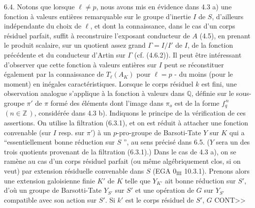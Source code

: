 6.4. Notons que lorsque $\ell \neq p$, nous avons mis en évidence dans 4.3 a) une fonction à valeurs entières remarquable sur le groupe d'inertie $I$ de $S$, d'ailleurs indépendante du choix de $\ell$, et dont la connaissance, dans le cas d'un corps résiduel parfait, suffit à reconstruire l'exposant conducteur de $A$ (4.5), en prenant le produit scalaire, sur un quotient assez grand $\Gamma = I/I'$ de $I$, de la fonction précédente et du conducteur d'Artin sur $\Gamma$ (cf. (4.6.2)). Il peut être intéressant d'observer que cette fonction à valeurs entières sur $I$ peut se réconstituer également par la connaissance de $T_\ell(A_K)$ pour $\ell = p$ - du moins (pour le moment) en inégales caractéristiques. Lorsque le corps résiduel $k$ est fini, une observation analogue s'applique à la fonction à valeurs dans $\mathbb{Q}$, définie sur le sous-groupe $\pi'$ de $\pi$ formé des éléments dont l'image dans $\pi_o$ est de la forme $f_q^{\,n}$ $(n \in \mathbb{Z}\,)$, considérée dans 4.3 b). Indiquons le principe de la vérification de ces assertions. On utilise la filtration (6.3.1), et on est réduit à attacher une fonction convenable (sur $I$ resp. sur $\pi'$) à un $p$-pro-groupe de Barsoti-Tate $Y$ sur $K$ qui a ``essentiellement bonne réduction sur $S$ '', au sens précisé dans 6.5. ($Y$ sera un des trois quotients provenant de la filtration (6.3.1).) Dans le cas de 4.3 a), on se ramène au cas d'un corps résiduel parfait (ou même algébriquement clos, si on veut) par extension résiduelle convenable dans $S$ (EGA $0_{\mathrm{III}}$ 10.3.1). Prenons alors une extension galoisienne finie $K'$ de $K$ telle que $Y_{K'}$ ait bonne réduction sur $S'$, d'où un groupe de Barsotti-Tate $Y_{S'}$ sur $S'$ et une opération de $G$ sur $Y_{S'}$ compatible avec son action sur $S'$. Si $k'$ est le corps résiduel de $S'$, $G$ CONT>>



